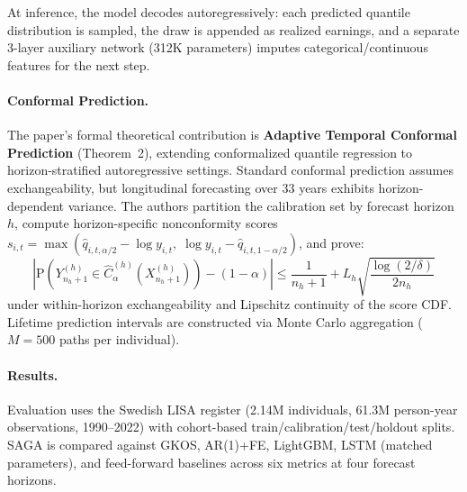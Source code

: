 \documentclass[11pt,a4paper]{article}
\begin{document}
At inference, the model decodes autoregressively: each predicted quantile distribution is sampled, the draw is appended as realized earnings, and a separate 3-layer auxiliary network (312K parameters) imputes categorical/continuous features for the next step.

\paragraph{Conformal Prediction.}
The paper's formal theoretical contribution is \textbf{Adaptive Temporal Conformal Prediction} (Theorem~2), extending conformalized quantile regression to horizon-stratified autoregressive settings. Standard conformal prediction assumes exchangeability, but longitudinal forecasting over 33 years exhibits horizon-dependent variance. The authors partition the calibration set by forecast horizon $h$, compute horizon-specific nonconformity scores $s_{i,t} = \max(\hat{q}_{i,t,\alpha/2} - \log y_{i,t},\; \log y_{i,t} - \hat{q}_{i,t,1-\alpha/2})$, and prove:
\begin{equation}
    \left| \mathrm{P}\left(Y_{n_h+1}^{(h)} \in \hat{C}_\alpha^{(h)}(X_{n_h+1}^{(h)})\right) - (1-\alpha) \right| \leq \frac{1}{n_h+1} + L_h \sqrt{\frac{\log(2/\delta)}{2n_h}}
\end{equation}
under within-horizon exchangeability and Lipschitz continuity of the score CDF. Lifetime prediction intervals are constructed via Monte Carlo aggregation ($M = 500$ paths per individual).

\paragraph{Results.}
Evaluation uses the Swedish LISA register (2.14M individuals, 61.3M person-year observations, 1990--2022) with cohort-based train/calibration/test/holdout splits. SAGA is compared against GKOS, AR(1)+FE, LightGBM, LSTM (matched parameters), and feed-forward baselines across six metrics at four forecast horizons.
\end{document}
